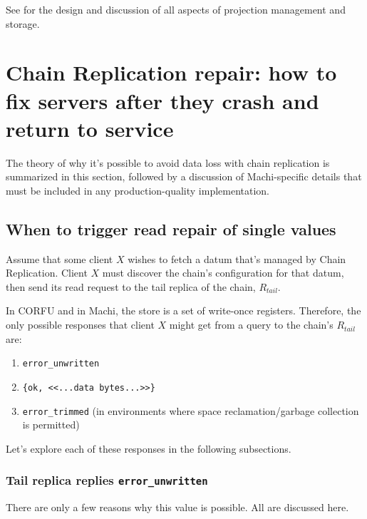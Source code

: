 \documentclass[preprint,10pt]{sigplanconf}
\begin{document}
See \cite{machi-chain-manager-design} for the design and discussion of
all aspects of projection management and storage.

\section{Chain Replication repair: how to fix servers after they crash
and return to service}
\label{sec:repair}

The theory of why it's possible to avoid
data loss with chain replication is summarized in this section,
followed by a discussion of Machi-specific details that must be
included in any production-quality implementation.

\subsection{When to trigger read repair of single values}

Assume that some client $X$ wishes to fetch a datum that's managed
by Chain Replication.  Client $X$ must discover the chain's
configuration for that datum, then send its read request to the tail
replica of the chain, $R_{tail}$.

In CORFU and in Machi, the store is a set of write-once registers.
Therefore, the only possible responses that client $X$ might get from a
query to the chain's $R_{tail}$ are:

\begin{enumerate}
\item {\tt error\_unwritten}
\item {\tt \{ok, <<...data bytes...>>\}}
\item {\tt error\_trimmed} (in environments where space
  reclamation/garbage collection is permitted)
\end{enumerate}

Let's explore each of these responses in the following subsections.

\subsubsection{Tail replica replies {\tt error\_unwritten}}

There are only a few reasons why this value is possible.  All are
discussed here.
\end{document}
